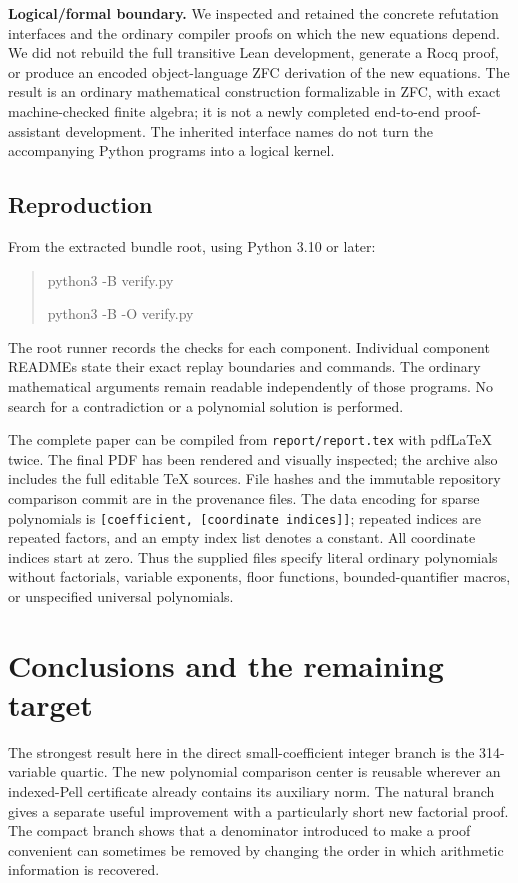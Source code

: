 \documentclass[11pt,a4paper]{article}
\theoremstyle{remark}\newtheorem{remark}[theorem]{Remark}
\newcommand{\code}[1]{\nolinkurl{#1}}
\begin{document}
\textbf{Logical/formal boundary.}
We inspected and retained the concrete refutation interfaces and the
ordinary compiler proofs on which the new equations depend. We did not
rebuild the full transitive Lean development, generate a Rocq proof, or
produce an encoded object-language ZFC derivation of the new equations.
The result is an ordinary mathematical construction formalizable in ZFC,
with exact machine-checked finite algebra; it is not a newly completed
end-to-end proof-assistant development. The inherited interface names do
not turn the accompanying Python programs into a logical kernel.

\subsection{Reproduction}

From the extracted bundle root, using Python 3.10 or later:
\begin{quote}\ttfamily
python3 -B verify.py\par
python3 -B -O verify.py
\end{quote}
The root runner records the checks for each component. Individual
component READMEs state their exact replay boundaries and commands.
The ordinary mathematical arguments remain readable independently of
those programs. No search for a contradiction or a polynomial solution
is performed.

The complete paper can be compiled from \code{report/report.tex} with
pdfLaTeX twice. The final PDF has been rendered and visually inspected;
the archive also includes the full editable TeX sources. File hashes and
the immutable repository comparison commit are in the provenance files.
The data encoding for sparse polynomials is
\code{[coefficient, [coordinate indices]]}; repeated indices are repeated
factors, and an empty index list denotes a constant. All coordinate
indices start at zero. Thus the supplied files specify literal ordinary
polynomials without factorials, variable exponents, floor functions,
bounded-quantifier macros, or unspecified universal polynomials.

\section{Conclusions and the remaining target}

The strongest result here in the direct small-coefficient integer branch
is the 314-variable quartic. The new polynomial comparison center is
reusable wherever an indexed-Pell certificate already contains its
auxiliary norm. The natural branch gives a separate useful improvement
with a particularly short new factorial proof. The compact branch shows
that a denominator introduced to make a proof convenient can sometimes
be removed by changing the order in which arithmetic information is
recovered.
\end{document}
